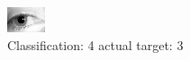 \begin{figure}[h!]
\begin{center}
\includegraphics[width=0.60\columnwidth]{figures/ID1264_class_4_target_3.png}
\end{center}
\caption{ Classification: 4 actual target: 3}
\label{fig:ID1264_class_4_target_3}
\end{figure}
